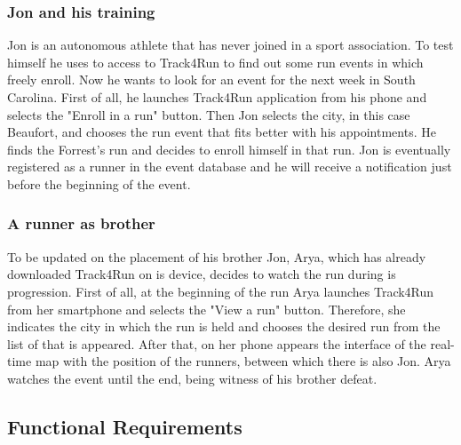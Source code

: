 \documentclass[a4paper]{article}
\begin{document}
\subsubsection{Jon and his training}
Jon is an autonomous athlete that has never joined in a sport association. To test himself he uses to access to Track4Run to find out some run events in which freely enroll. Now he wants to look for an event for the next week in South Carolina. \newline
First of all, he launches Track4Run application from his phone and selects the "Enroll in a run" button. Then Jon selects the city, in this case Beaufort, and chooses the run event that fits better with his appointments. He finds the Forrest's run and decides to enroll himself in that run. \newline
Jon is eventually registered as a runner in the event database and he will receive a notification just before the beginning of the event.

\subsubsection{A runner as brother}
To be updated on the placement of his brother Jon, Arya, which has already downloaded Track4Run on is device, decides to watch the run during is progression. \newline
First of all, at the beginning of the run Arya launches Track4Run from her smartphone and selects the "View a run" button. Therefore, she indicates the city in which the run is held and chooses the desired run from the list of that is appeared. After that, on her phone appears the interface of the real-time map with the position of the runners, between which there is also Jon. \newline
Arya watches the event until the end, being witness of his brother defeat.

\clearpage

\subsection{Functional Requirements}
\end{document}
